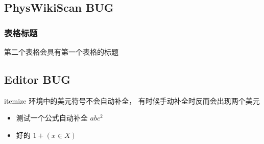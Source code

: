 
\subsection{PhysWikiScan BUG}

\subsubsection{表格标题}
第二个表格会具有第一个表格的标题

\subsection{Editor BUG}
itemize 环境中的美元符号不会自动补全， 有时候手动补全时反而会出现两个美元
\begin{itemize}
\item 测试一个公式自动补全 $abc^2$

\item 好的 $1 + (x \in X)$
\end{itemize}
